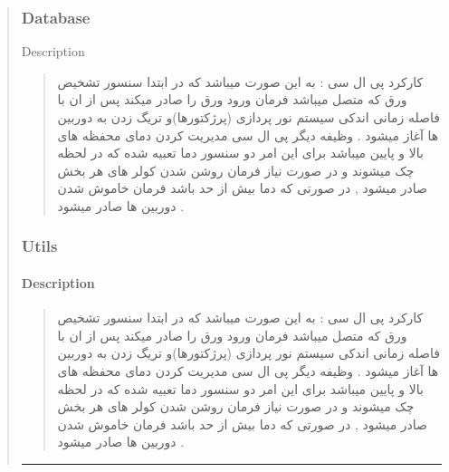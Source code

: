 \documentclass[letterpaper,10pt,english]{sphinxmanual}
\begin{document}
\begin{quote}
\sphinxstepscope


\subsubsection{Database}
\label{\detokenize{setting/database Dir:database}}\label{\detokenize{setting/database Dir::doc}}
\sphinxAtStartPar
Description
\begin{quote}\begin{farsi}

\sphinxAtStartPar
کارکرد پی ال سی : به این صورت میباشد که در ابتدا سنسور تشخیص ورق که متصل میباشد فرمان ورود ورق را صادر میکند پس از ان با فاصله زمانی اندکی سیستم نور پردازی (پرژکتورها)و تریگ زدن به دوربین ها آغاز میشود . وظیفه دیگر پی ال سی مدیریت کردن دمای محفظه های بالا و پایین میباشد برای این امر دو سنسور دما تعبیه شده که در لحظه چک میشوند و در صورت نیاز فرمان روشن شدن کولر های هر بخش صادر میشود , در صورتی که دما بیش از حد باشد فرمان خاموش شدن دوربین ها صادر میشود .
\end{farsi}\end{quote}

\sphinxstepscope


\subsubsection{Utils}
\label{\detokenize{setting/utils Dir:utils}}\label{\detokenize{setting/utils Dir::doc}}

\paragraph{Description}
\label{\detokenize{setting/utils Dir:description}}\begin{quote}\begin{farsi}

\sphinxAtStartPar
کارکرد پی ال سی : به این صورت میباشد که در ابتدا سنسور تشخیص ورق که متصل میباشد فرمان ورود ورق را صادر میکند پس از ان با فاصله زمانی اندکی سیستم نور پردازی (پرژکتورها)و تریگ زدن به دوربین ها آغاز میشود . وظیفه دیگر پی ال سی مدیریت کردن دمای محفظه های بالا و پایین میباشد برای این امر دو سنسور دما تعبیه شده که در لحظه چک میشوند و در صورت نیاز فرمان روشن شدن کولر های هر بخش صادر میشود , در صورتی که دما بیش از حد باشد فرمان خاموش شدن دوربین ها صادر میشود .
\end{farsi}\end{quote}


\bigskip\hrule\bigskip




\end{quote}
\end{document}
